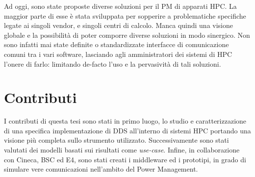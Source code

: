 Ad oggi, sono state proposte diverse soluzioni per il PM di apparati HPC. La maggior parte di esse è stata sviluppata per sopperire a problematiche specifiche legate ai singoli vendor, e singoli centri di calcolo. Manca quindi una visione globale e la possibilità di poter comporre diverse soluzioni in modo sinergico.
Non sono infatti mai state definite o standardizzate interfacce di comunicazione comuni tra i vari software, lasciando agli amministratori dei sistemi di HPC l'onere di farlo: limitando de-facto l'uso e la pervasività di tali soluzioni.





\section{Contributi}
I contributi di questa tesi sono stati in primo luogo, lo studio e caratterizzazione di una specifica implementazione di DDS all'interno di sistemi HPC portando una visione più completa sullo strumento utilizzato. Successivamente sono stati valutati dei modelli basati sui risultati come \emph{use-case}. Infine, in collaborazione con Cineca\cite{Cineca}, BSC\cite{BSC} ed E4\cite{E4}, sono stati creati i middleware ed i prototipi, in grado di simulare vere comunicazioni nell'ambito del Power Management.